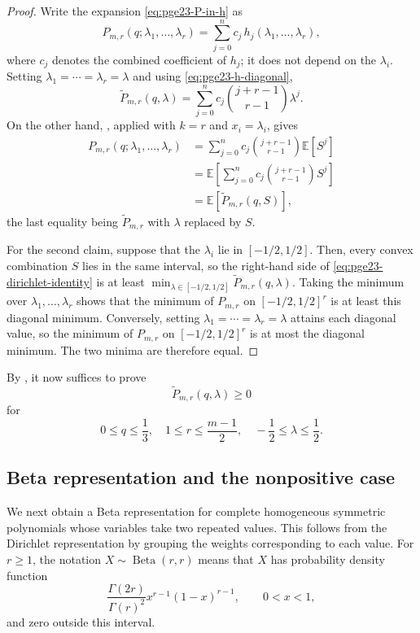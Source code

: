 \documentclass[11pt]{article}
\theoremstyle{remark}
\numberwithin{equation}{section}
\newcommand{\E}{\mathbb E}
\newcommand{\BetaLaw}{\operatorname{Beta}}
\begin{document}
\begin{proof}
  Write the expansion \eqref{eq:pge23-P-in-h} as
  \[
    P_{m,r}(q;\lambda_1,\ldots,\lambda_r)
    =\sum_{j=0}^nc_j\,h_j(\lambda_1,\ldots,\lambda_r),
  \]
  where $c_j$ denotes the combined coefficient of $h_j$; it does not
  depend on the $\lambda_i$.
  Setting $\lambda_1=\cdots=\lambda_r=\lambda$ and using
  \eqref{eq:pge23-h-diagonal},
  \begin{equation*}
    \widetilde P_{m,r}(q,\lambda)
    =\sum_{j=0}^nc_j\binom{j+r-1}{r-1}\lambda^j.
  \end{equation*}
  On the other hand, , applied with
  $k=r$ and $x_i=\lambda_i$, gives
  \begin{align*}
    P_{m,r}(q;\lambda_1,\ldots,\lambda_r)
    &=\sum_{j=0}^nc_j\binom{j+r-1}{r-1}\E\left[S^j\right]\\
    &=\E\left[\sum_{j=0}^nc_j\binom{j+r-1}{r-1}S^j\right]\\
    &=\E\left[\widetilde P_{m,r}(q,S)\right],
  \end{align*}
  the last equality being $\widetilde P_{m,r}$ with $\lambda$ replaced by $S$.

  For the second claim, suppose that the $\lambda_i$ lie in
  $[-1/2,1/2]$. Then, every convex combination $S$ lies in the same
  interval, so the right-hand side of
  \eqref{eq:pge23-dirichlet-identity} is at least
  $\min_{\lambda\in[-1/2,1/2]}\widetilde P_{m,r}(q,\lambda)$.
  Taking the minimum over $\lambda_1,\ldots,\lambda_r$ shows that the
  minimum of $P_{m,r}$ on $[-1/2,1/2]^r$ is at least this diagonal minimum.
  Conversely, setting $\lambda_1=\cdots=\lambda_r=\lambda$ attains each
  diagonal value, so the minimum of $P_{m,r}$ on $[-1/2,1/2]^r$ is at most
  the diagonal minimum. The two minima are therefore equal.
\end{proof}

By , it now suffices to prove
\begin{equation*}
  \widetilde P_{m,r}(q,\lambda)\ge0
\end{equation*}
for
\[
  0\le q\le\frac{1}{3},
  \quad 1\le r\le\frac{m-1}{2},
  \quad -\frac{1}{2}\le\lambda\le\frac{1}{2}.
\]

\subsection{Beta representation and the nonpositive case}
\label{subsec:beta-representation}

We next obtain a Beta representation for complete homogeneous symmetric
polynomials whose variables take two repeated values. This follows from the
Dirichlet representation by grouping the weights corresponding to each value.
For $r\ge1$, the notation $X\sim\BetaLaw(r,r)$ means that $X$ has probability density function
\[
  \frac{\Gamma(2r)}{\Gamma(r)^2}x^{r-1}(1-x)^{r-1},
  \qquad 0<x<1,
\]
and zero outside this interval.
\end{document}
